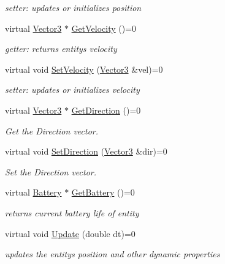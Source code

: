 \begin{DoxyCompactItemize}
\begin{DoxyCompactList}\small\item\em setter\+: updates or initializes position \end{DoxyCompactList}\item 
\mbox{\label{classiMovableEntity_a1285f3317ed9b2d59d8701711b5c3e67}} 
virtual \hyperlink{classVector3}{Vector3} $\ast$ \hyperlink{classiMovableEntity_a1285f3317ed9b2d59d8701711b5c3e67}{Get\+Velocity} ()=0
\begin{DoxyCompactList}\small\item\em getter\+: returns entity\textquotesingle{}s velocity \end{DoxyCompactList}\item 
\mbox{\label{classiMovableEntity_ab1b67096acd0e25f97ecceeeeed1c972}} 
virtual void \hyperlink{classiMovableEntity_ab1b67096acd0e25f97ecceeeeed1c972}{Set\+Velocity} (\hyperlink{classVector3}{Vector3} \&vel)=0
\begin{DoxyCompactList}\small\item\em setter\+: updates or initializes velocity \end{DoxyCompactList}\item 
virtual \hyperlink{classVector3}{Vector3} $\ast$ \hyperlink{classiMovableEntity_a8705402280a16c7eb6a271d1be34e678}{Get\+Direction} ()=0
\begin{DoxyCompactList}\small\item\em Get the Direction vector. \end{DoxyCompactList}\item 
virtual void \hyperlink{classiMovableEntity_a631c4a8e24360bedecf1a675a18b10ef}{Set\+Direction} (\hyperlink{classVector3}{Vector3} \&dir)=0
\begin{DoxyCompactList}\small\item\em Set the Direction vector. \end{DoxyCompactList}\item 
\mbox{\label{classiMovableEntity_a1d42f090ef93958ab543914669632da4}} 
virtual \hyperlink{classBattery}{Battery} $\ast$ \hyperlink{classiMovableEntity_a1d42f090ef93958ab543914669632da4}{Get\+Battery} ()=0
\begin{DoxyCompactList}\small\item\em returns current battery life of entity \end{DoxyCompactList}\item 
\mbox{\label{classiMovableEntity_afa73b4b5381e1ad0668b1c468bc0970f}} 
virtual void \hyperlink{classiMovableEntity_afa73b4b5381e1ad0668b1c468bc0970f}{Update} (double dt)=0
\begin{DoxyCompactList}\small\item\em updates the entity\textquotesingle{}s position and other dynamic properties \end{DoxyCompactList}\end{DoxyCompactItemize}


